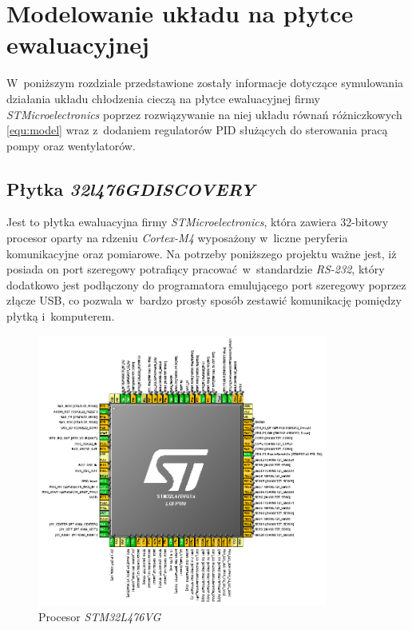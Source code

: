 \section{Modelowanie układu na płytce ewaluacyjnej}
\indent

W~poniższym rozdziale przedstawione zostały informacje dotyczące symulowania
działania układu chłodzenia cieczą na płytce ewaluacyjnej firmy
\textit{STMicroelectronics} poprzez rozwiązywanie na niej układu równań
różniczkowych \eqref{equ:model} wraz z~dodaniem regulatorów PID służących do
sterowania pracą pompy oraz wentylatorów.

\subsection{Płytka \textit{32l476GDISCOVERY}}
\indent

Jest to płytka ewaluacyjna firmy \textit{STMicroelectronics}, która zawiera
32-bitowy procesor oparty na rdzeniu \textit{Cortex-M4} wyposażony w~liczne
peryferia komunikacyjne oraz pomiarowe. Na potrzeby poniższego projektu ważne
jest, iż posiada on port szeregowy potrafiący pracować w~standardzie
\textit{RS-232}, który dodatkowo jest podłączony do programatora emulującego
port szeregowy poprzez złącze USB, co pozwala w~bardzo prosty sposób zestawić
komunikację pomiędzy płytką i~komputerem.

\begin{figure}[!ht]
    \centering
    \includegraphics[width=0.85\textwidth]{../img/stm32disco.png}
    \caption{Procesor \textit{STM32L476VG}}
    \label{fig:stm32disco}
\end{figure}

